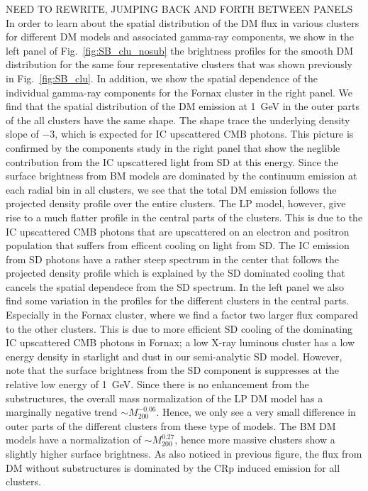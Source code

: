 \documentclass[10pt,aps,pra,reprint,amsmath,amsfonts,amssymb,showpacs]{revtex4-1}
\newcommand{\mvir}{M_{200}}
\begin{document}
NEED TO REWRITE, JUMPING BACK AND FORTH BETWEEN PANELS In order to
learn about the spatial distribution of the DM flux in various
clusters for different DM models and associated gamma-ray components,
we show in the left panel of Fig.~\ref{fig:SB_clu_nosub} the
brightness profiles for the smooth DM distribution for the same four
representative clusters that was shown previously in
Fig.~\ref{fig:SB_clu}. In addition, we show the spatial dependence of
the individual gamma-ray components for the Fornax cluster in the
right panel. We find that the spatial distribution of the DM emission
at 1~GeV in the outer parts of the all clusters have the same
shape. The shape trace the underlying density slope of $-3$, which is
expected for IC upscattered CMB photons. This picture is confirmed by
the components study in the right panel that show the neglible
contribution from the IC upscattered light from SD at this
energy. Since the surface brightness from BM models are dominated by
the continuum emission at each radial bin in all clusters, we see that
the total DM emission follows the projected density profile over the
entire clusters. The LP model, however, give rise to a much flatter
profile in the central parts of the clusters. This is due to the IC
upscattered CMB photons that are upscattered on an electron and
positron population that suffers from efficent cooling on light from
SD. The IC emission from SD photons have a rather steep spectrum in
the center that follows the projected density profile which is
explained by the SD dominated cooling that cancels the spatial
dependece from the SD spectrum. In the left panel we also find some
variation in the profiles for the different clusters in the central
parts. Especially in the Fornax cluster, where we find a factor two
larger flux compared to the other clusters. This is due to more
efficient SD cooling of the dominating IC upscattered CMB photons in
Fornax; a low X-ray luminous cluster has a low energy density in
starlight and dust in our semi-analytic SD model. However, note that
the surface brightness from the SD component is suppresses at the
relative low energy of 1~GeV.  Since there is no enhancement from the
substructures, the overall mass normalization of the LP DM model has a
marginally negative trend $\sim\mvir^{-0.06}$. Hence, we only see a
very small difference in outer parts of the different clusters from
these type of models. The BM DM models have a normalization of
$\sim\mvir^{0.27}$, hence more massive clusters show a slightly higher
surface brightness. As also noticed in previous figure, the flux from
DM without substructures is dominated by the CRp induced emission for
all clusters.
\end{document}
